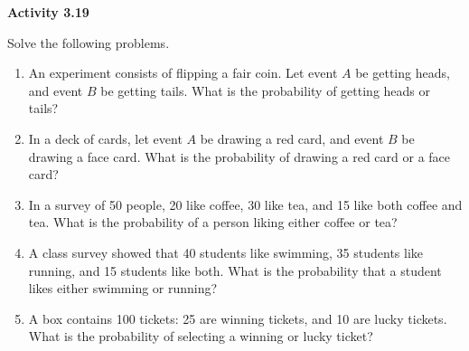 \vspace{0.3ex}
\noindent\textbf{Activity 3.19}

\vspace{0.2ex}

Solve the following problems.

\begin{enumerate}[label=\color{blue}\arabic*.]
    \item An experiment consists of flipping a fair coin. Let event \(A\) be getting heads, and event \(B\) be getting tails. What is the probability of getting heads or tails?
    \item In a deck of cards, let event \(A\) be drawing a red card, and event \(B\) be drawing a face card. What is the probability of drawing a red card or a face card?
    \item In a survey of 50 people, 20 like coffee, 30 like tea, and 15 like both coffee and tea. What is the probability of a person liking either coffee or tea?
    \item A class survey showed that 40 students like swimming, 35 students like running, and 15 students like both. What is the probability that a student likes either swimming or running?
    \item A box contains 100 tickets: 25 are winning tickets, and 10 are lucky tickets. What is the probability of selecting a winning or lucky ticket?
\end{enumerate}
